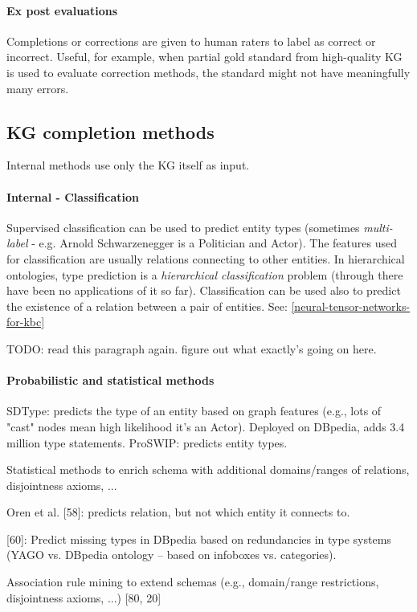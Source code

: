 \paragraph{Ex post evaluations}
Completions or corrections are given to human raters to label as correct or
incorrect. Useful, for example, when partial gold standard from high-quality KG
is used to evaluate correction methods, the standard might not have
meaningfully many errors.

\subsection{KG completion methods}
Internal methods use only the KG itself as input.

\paragraph{Internal - Classification}
Supervised classification can be used to predict entity types (sometimes
\textit{multi-label} - e.g. Arnold Schwarzenegger is a Politician and Actor).
The features used for classification are usually relations connecting to other
entities. In hierarchical ontologies, type prediction is a \textit{hierarchical
classification} problem (through there have been no applications of it so far).
Classification can be used also to predict the existence of a relation between
a pair of entities.
See: \ref{neural-tensor-networks-for-kbc}

TODO: read this paragraph again. figure out what exactly's going on here.

\paragraph{Probabilistic and statistical methods}
SDType: predicts the type of an entity based on graph features (e.g., lots of
"cast" nodes mean high likelihood it's an Actor). Deployed on DBpedia, adds 3.4
million type statements.
ProSWIP: predicts entity types.

Statistical methods to enrich schema with additional domains/ranges of
relations, disjointness axioms, ...

Oren et al. [58]: predicts relation, but not which entity it connects to.

[60]: Predict missing types in DBpedia based on redundancies in type systems
(YAGO vs. DBpedia ontology -- based on infoboxes vs. categories).

Association rule mining to extend schemas (e.g., domain/range restrictions,
disjointness axioms, ...) [80, 20]

